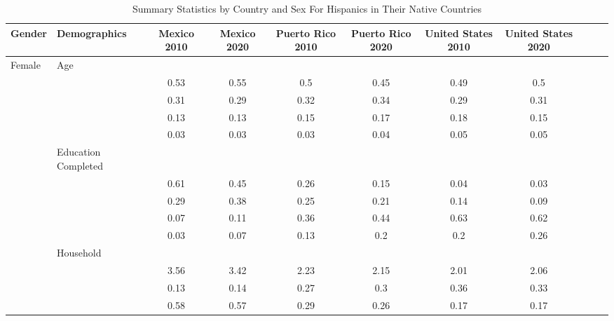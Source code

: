 \begin{table}[ht]
\centering
\caption{Summary Statistics by Country and Sex For Hispanics in Their Native Countries} 
\begingroup\small
\begin{tabular}{l>{\raggedright\arraybackslash}p{3.2cm}|ccccccccc}
  \hline
Gender & Demographics & Mexico 2010 & Mexico 2020 & Puerto Rico 2010 & Puerto Rico 2020 & United States 2010 & United States 2020 \\ 
  \hline
Female & Age &  &  &  &  &  &  \\ 
   & \multicolumn{1}{>{\raggedleft\arraybackslash}p{1.5cm}|}{\makebox[1.5cm][r]{60 - 69 }} & 0.53 & 0.55 & 0.5 & 0.45 & 0.49 & 0.5 \\ 
   & \multicolumn{1}{>{\raggedleft\arraybackslash}p{1.5cm}|}{\makebox[1.5cm][r]{70 - 79 }} & 0.31 & 0.29 & 0.32 & 0.34 & 0.29 & 0.31 \\ 
   & \multicolumn{1}{>{\raggedleft\arraybackslash}p{1.5cm}|}{\makebox[1.5cm][r]{80 - 89 }} & 0.13 & 0.13 & 0.15 & 0.17 & 0.18 & 0.15 \\ 
   & \multicolumn{1}{>{\raggedleft\arraybackslash}p{1.5cm}|}{\makebox[1.5cm][r]{90 plus }} & 0.03 & 0.03 & 0.03 & 0.04 & 0.05 & 0.05 \\ 
   & Education Completed &  &  &  &  &  &  \\ 
   & \multicolumn{1}{>{\raggedleft\arraybackslash}p{3.2cm}|}{\makebox[3.2cm][r]{Less than Primary }} & 0.61 & 0.45 & 0.26 & 0.15 & 0.04 & 0.03 \\ 
   & \multicolumn{1}{>{\raggedleft\arraybackslash}p{1.7cm}|}{\makebox[1.7cm][r]{Primary }} & 0.29 & 0.38 & 0.25 & 0.21 & 0.14 & 0.09 \\ 
   & \multicolumn{1}{>{\raggedleft\arraybackslash}p{2cm}|}{\makebox[2cm][r]{Secondary }} & 0.07 & 0.11 & 0.36 & 0.44 & 0.63 & 0.62 \\ 
   & \multicolumn{1}{>{\raggedleft\arraybackslash}p{2cm}|}{\makebox[2cm][r]{University }} & 0.03 & 0.07 & 0.13 & 0.2 & 0.2 & 0.26 \\ 
   & Household &  &  &  &  &  &  \\ 
   & \multicolumn{1}{>{\raggedleft\arraybackslash}p{2.7cm}|}{\makebox[2.7cm][r]{Household Size }} & 3.56 & 3.42 & 2.23 & 2.15 & 2.01 & 2.06 \\ 
   & \multicolumn{1}{>{\raggedleft\arraybackslash}p{2.2cm}|}{\makebox[2.2cm][r]{Lives Alone }} & 0.13 & 0.14 & 0.27 & 0.3 & 0.36 & 0.33 \\ 
   & \multicolumn{1}{>{\raggedleft\arraybackslash}p{2.9cm}|}{\makebox[2.9cm][r]{Lives with Child }} & 0.58 & 0.57 & 0.29 & 0.26 & 0.17 & 0.17 \\ 

\end{tabular}
\end{table}
